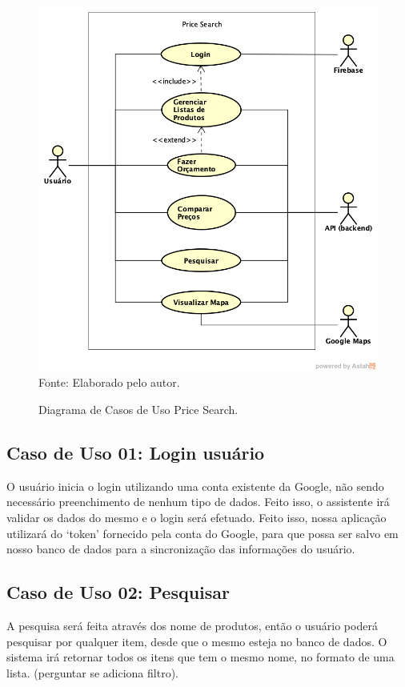 \begin{figure}[!htb]
\centering
\caption{Diagrama de Casos de Uso Price Search.}
\includegraphics[width=\linewidth]{figuras/DiagramaCasosUsoPriceSearch.png}
{\footnotesize Fonte: Elaborado pelo autor.}
\end{figure}

\subsection{Caso de Uso 01: Login usuário}

O usuário inicia o login utilizando uma conta existente da Google, não sendo necessário preenchimento de nenhum tipo de dados. Feito isso, o assistente irá validar os dados do mesmo e o login será efetuado. Feito isso, nossa aplicação utilizará do ‘token’ fornecido pela conta do Google, para que possa ser salvo em nosso banco de dados para a sincronização das informações do usuário.

\subsection{Caso de Uso 02: Pesquisar}

A pesquisa será feita através dos nome de produtos, então o usuário poderá pesquisar por qualquer item, desde que o mesmo esteja no banco de dados. O sistema irá retornar todos os itens que tem o mesmo nome, no formato de uma lista. (perguntar se adiciona filtro).

